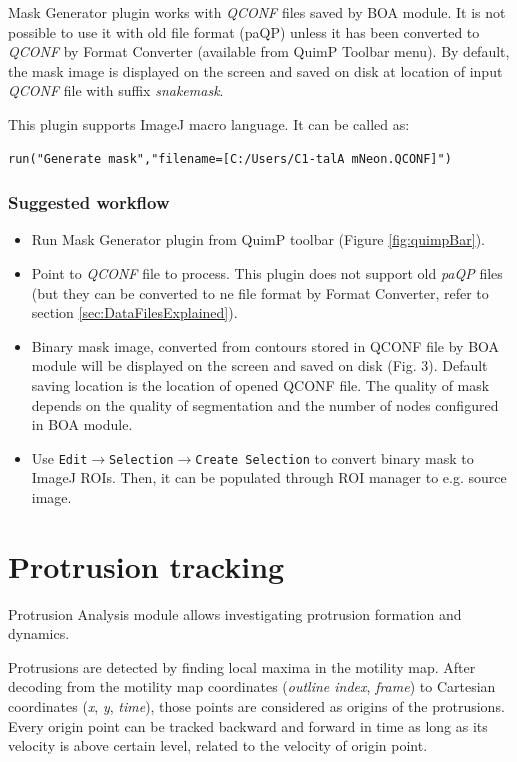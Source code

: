 \documentclass[a4paper,12pt]{article}
\begin{document}
Mask Generator plugin works with \textit{QCONF} files saved by BOA module. It is not possible to use it with old file format (paQP) unless it has been converted to \textit{QCONF} by Format Converter (available from QuimP Toolbar menu). By default, the mask image is displayed on the screen and saved on disk at location of input \textit{QCONF} file with suffix \textit{snakemask}.

This plugin supports ImageJ macro language. It can be called as:
 
\begin{lstlisting}[]
run("Generate mask","filename=[C:/Users/C1-talA mNeon.QCONF]") 
\end{lstlisting}

\subsubsection{Suggested workflow}

\begin{itemize}
	\item Run Mask Generator plugin from QuimP toolbar (Figure \ref{fig:quimpBar}).
	\item Point to \textit{QCONF} file to process. This plugin does not support old \textit{paQP} files (but they can be converted to ne file format by Format Converter, refer to section \ref{sec:DataFilesExplained}).
	\item Binary mask image, converted from contours stored in QCONF file by BOA module will be displayed on the screen and saved on disk (Fig. 3). Default saving location is the location of opened QCONF file. The quality of mask depends on the quality of segmentation and the number of nodes configured in BOA module.
	\item Use \texttt{Edit$\rightarrow$Selection$\rightarrow$Create Selection} to convert binary mask to ImageJ ROIs. Then, it can be populated through ROI manager to e.g. source image.
\end{itemize}

\section{Protrusion tracking}
\label{sec:ProtTracking}

Protrusion Analysis module allows investigating protrusion formation and dynamics.

Protrusions are detected by finding local maxima in the motility map. After decoding from the motility map coordinates (\textit{outline index}, \textit{frame}) to Cartesian coordinates (\textit{x}, \textit{y}, \textit{time}), those points are considered as origins of the protrusions. Every origin point can be tracked backward and forward in time as long as its velocity is above certain level, related to the velocity of origin point.
\end{document}
